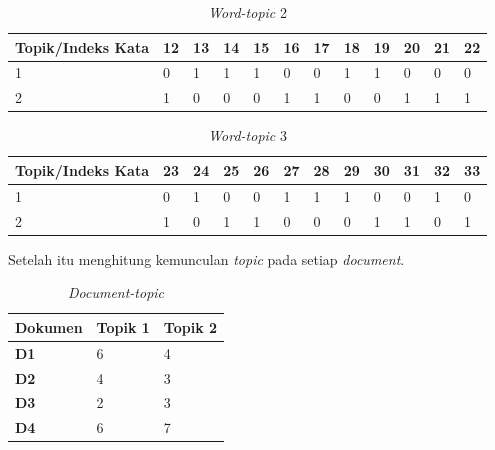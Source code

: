 \begin{table}[H]
	\caption{\textit{Word-topic} 2}
	\centering
	\small
	\begin{adjustbox}{width=1\textwidth}
	\begin{tabular}{|p{3.2cm}|p{0.5cm}|p{0.5cm}|p{0.5cm}|p{0.5cm}|p{0.5cm}|p{0.5cm}|p{0.5cm}|p{0.5cm}|p{0.5cm}|p{0.5cm}|p{0.5cm}|}
		\hline
		\textbf{Topik/Indeks Kata} & \textbf{12} & \textbf{13} & \textbf{14} & \textbf{15} & \textbf{16} & \textbf{17} & \textbf{18} & \textbf{19} & \textbf{20} & \textbf{21} & \textbf{22} 
		\\
		\hline
		1 & 0 & 1 & 1 & 1 & 0 & 0 & 1 & 1 & 0 & 0 & 0 \\
		\hline
		2 & 1 & 0 & 0 & 0 & 1 & 1 & 0 & 0 & 1 & 1 & 1 \\
		\hline
	\end{tabular}
	\end{adjustbox}
\end{table}

\begin{table}[H]
	\caption{\textit{Word-topic} 3}
	\centering
	\small
	\begin{adjustbox}{width=1\textwidth}
	\begin{tabular}{|p{3.2cm}|p{0.5cm}|p{0.5cm}|p{0.5cm}|p{0.5cm}|p{0.5cm}|p{0.5cm}|p{0.5cm}|p{0.5cm}|p{0.5cm}|p{0.5cm}|p{0.5cm}|}
		\hline
		\textbf{Topik/Indeks Kata} & \textbf{23} & \textbf{24} & \textbf{25} & \textbf{26} & \textbf{27} & \textbf{28} & \textbf{29} & \textbf{30} & \textbf{31} & \textbf{32} & \textbf{33} 
		\\
		\hline
		1 & 0 & 1 & 0 & 0 & 1 & 1 & 1 & 0 & 0 & 1 & 0 \\
		\hline
		2 & 1 & 0 & 1 & 1 & 0 & 0 & 0 & 1 & 1 & 0 & 1 \\
		\hline
	\end{tabular}
	\end{adjustbox}
\end{table}
\noindent Setelah itu menghitung kemunculan \textit{topic }pada setiap \textit{document}.
\begin{table}[H]
	\caption{\textit{Document-topic}}
	\centering
	\small
	\begin{adjustbox}{width=1\textwidth}
	\begin{tabular}{|p{4.6cm}|p{4cm}|p{4cm}|}
		\hline
		\textbf{Dokumen} & \textbf{Topik 1} & \textbf{Topik 2} \\
		\hline
		\textbf{D1} & 6 & 4 \\
		\hline
		\textbf{D2} & 4 & 3 \\
		\hline
		\textbf{D3} & 2 & 3 \\
		\hline
		\textbf{D4} & 6 & 7 \\
		\hline
	\end{tabular}
	\end{adjustbox}
\end{table}

